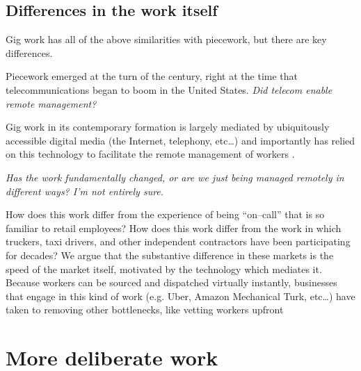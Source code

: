 \documentclass{sigchi}
\begin{document}
\subsection{Differences in the work itself}
Gig work has all of the above similarities with piecework,
but there are key differences.

Piecework emerged at the turn of the  century,
right at the time that telecommunications began to boom in the United States. %
\textit{Did telecom enable remote management?}

Gig work in its contemporary formation is largely mediated by
ubiquitously accessible digital media
(the Internet, telephony, etc\dots)
and importantly has relied on this technology to facilitate the remote management of workers
\cite{uberAlgorithm}.

\textit{Has the work fundamentally changed,
or are we just being managed remotely in different ways?
I'm not entirely sure.}

How does this work differ from the experience of being ``on--call'' that is so familiar to retail employees?
How does this work differ from the work in which truckers, taxi drivers, and other
independent contractors have been participating for decades?
We argue that the substantive difference in these markets is the speed of the market itself,
motivated by the technology which mediates it.
Because workers can be sourced and dispatched virtually instantly,
businesses that engage in this kind of work
(e.g. Uber, Amazon Mechanical Turk, etc\dots)
have taken to removing other bottlenecks,
like vetting workers upfront


\section{More deliberate work}


\printbibliography
\end{document}
